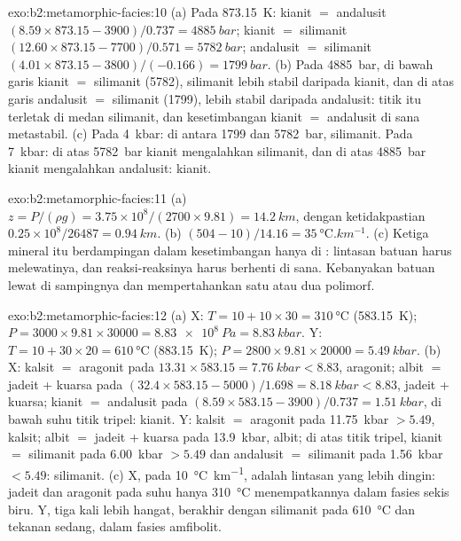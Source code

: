 \begin{solution}{exo:b2:metamorphic-facies:10}
(a) Pada \qty{873.15}{K}: kianit $=$ andalusit $(8.59\times873.15 - 3900)/0.737 =
\qty{4885}{bar}$; kianit $=$ silimanit $(12.60\times873.15 - 7700)/0.571 =
\qty{5782}{bar}$; andalusit $=$ silimanit $(4.01\times873.15 - 3800)/(-0.166) =
\qty{1799}{bar}$. (b) Pada \qty{4885}{bar}, di bawah garis kianit $=$ silimanit (5782),
silimanit lebih stabil daripada kianit, dan di atas garis andalusit $=$ silimanit
(1799), lebih stabil daripada andalusit: titik itu terletak di medan silimanit, dan
kesetimbangan kianit $=$ andalusit di sana metastabil. (c) Pada \qty{4}{kbar}: di antara 1799
dan \qty{5782}{bar}, silimanit. Pada \qty{7}{kbar}: di atas \qty{5782}{bar} kianit mengalahkan
silimanit, dan di atas \qty{4885}{bar} kianit mengalahkan andalusit: kianit.
\end{solution}

\begin{solution}{exo:b2:metamorphic-facies:11}
(a) $z = P/(\rho g) = 3.75\times10^8/(2700\times9.81) = \qty{14.2}{km}$, dengan ketidakpastian
$0.25\times10^8/26487 = \qty{0.94}{km}$. (b) $(504 - 10)/14.16 =
\qty{35}{\celsius.km^{-1}}$. (c) Ketiga mineral itu berdampingan dalam kesetimbangan hanya di
: lintasan batuan harus melewatinya, dan reaksi-reaksinya harus
berhenti di sana. Kebanyakan batuan lewat di sampingnya dan mempertahankan satu atau dua polimorf.
\end{solution}

\begin{solution}{exo:b2:metamorphic-facies:12}
(a) X: $T = 10 + 10\times30 = \qty{310}{\celsius}$ (\qty{583.15}{K}); $P = 3000\times
9.81\times30000 = \qty{8.83e8}{Pa} = \qty{8.83}{kbar}$. Y: $T = 10 + 30\times20 =
\qty{610}{\celsius}$ (\qty{883.15}{K}); $P = 2800\times9.81\times20000 = \qty{5.49}{kbar}$.
(b) X: kalsit $=$ aragonit pada $13.31\times583.15 = \qty{7.76}{kbar} < 8.83$, aragonit;
albit $=$ jadeit + kuarsa pada $(32.4\times583.15 - 5000)/1.698 = \qty{8.18}{kbar} <
8.83$, jadeit + kuarsa; kianit $=$ andalusit pada $(8.59\times583.15 - 3900)/0.737 =
\qty{1.51}{kbar}$, di bawah suhu titik tripel: kianit. Y: kalsit $=$
aragonit pada \qty{11.75}{kbar} $> 5.49$, kalsit; albit $=$ jadeit + kuarsa pada
\qty{13.9}{kbar}, albit; di atas titik tripel, kianit $=$ silimanit pada
\qty{6.00}{kbar} $> 5.49$ dan andalusit $=$ silimanit pada \qty{1.56}{kbar} $< 5.49$:
silimanit. (c) X, pada \qty{10}{\celsius\per\km}, adalah lintasan yang lebih dingin: jadeit dan
aragonit pada suhu hanya \qty{310}{\celsius} menempatkannya dalam fasies sekis biru. Y, tiga kali
lebih hangat, berakhir dengan silimanit pada \qty{610}{\celsius} dan tekanan sedang, dalam
fasies amfibolit.
\end{solution}

